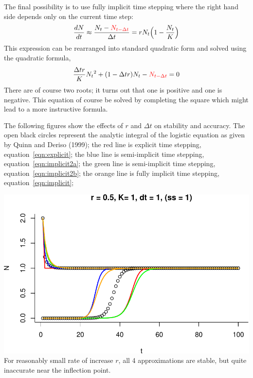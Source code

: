 \documentclass[12pt,letterpaper]{article}
\newcommand\Nm{{\color{red}N_{t-\Delta t}}}
\begin{document}
The final possibility is to use fully  implicit time stepping where
the right hand side depends only on the current time step:
\begin{equation*}
\frac{dN}{dt} \approx \frac{N_t-\Nm}{\Delta t} =
rN_t\Big(1-\frac{N_t}{K}\Big)
\end{equation*}
This expression can be rearranged into standard quadratic form and
solved using the quadratic formula,
\begin{equation}
\frac{\Delta t r}{K}{N_t}^2 +(1-\Delta t r)N_t - \Nm = 0
\label{eqn:implicit}
\end{equation}
There are of course two roots; it turns out that one is positive and
one is negative. This equation of course be solved by completing the
square which might lead to a more instructive formula.

The following figures show the effects of $r$ and $\Delta t$ on
stability and accuracy. The open black circles represent the analytic
integral of the logistic equation as given by Quinn and Deriso (1999);
the red line is explicit time stepping,
equation~\ref{eqn:explicit}; 
the blue line is semi-implicit time stepping, equation~\ref{eqn:implicit2a};
the green line is semi-implicit time stepping, equation~\ref{eqn:implicit2b};
the orange line is fully implicit time stepping, equation~\ref{eqn:implicit};

\includegraphics[width=\textwidth]{graphics/r05K1dt1ss1}
For reasonably small rate of increase $r$, all 4 approximations are stable, but
quite  inaccurate near the inflection point.
\end{document}
